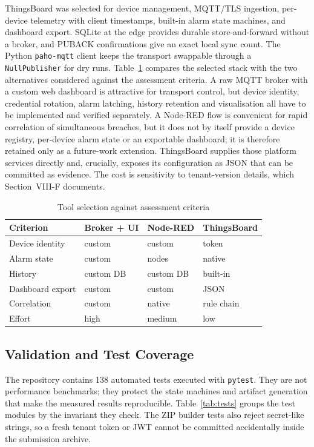 \documentclass[conference]{IEEEtran}
\begin{document}
ThingsBoard was selected for device management, MQTT/TLS ingestion, per-device telemetry
with client timestamps, built-in alarm state machines, and dashboard export. SQLite at
the edge provides durable store-and-forward without a broker, and PUBACK confirmations
give an exact local sync count. The Python \texttt{paho-mqtt} client keeps the transport
swappable through a \texttt{NullPublisher} for dry runs.
Table~\ref{tab:tools} compares the selected stack with the two alternatives
considered against the assessment criteria. A raw MQTT broker with a custom web
dashboard is attractive for transport control, but device identity, credential
rotation, alarm latching, history retention and visualisation all have to be
implemented and verified separately. A Node-RED flow is convenient for rapid
correlation of simultaneous breaches, but it does not by itself provide a
device registry, per-device alarm state or an exportable dashboard; it is
therefore retained only as a future-work extension. ThingsBoard supplies those
platform services directly and, crucially, exposes its configuration as JSON
that can be committed as evidence. The cost is sensitivity to tenant-version
details, which Section~VIII-F documents.

\begin{table}[t]
\caption{Tool selection against assessment criteria}
\label{tab:tools}
\centering
\scriptsize
\begin{tabular}{@{}llll@{}}
\toprule
Criterion & Broker + UI & Node-RED & ThingsBoard \\
\midrule
Device identity & custom & custom & token \\
Alarm state & custom & nodes & native \\
History & custom DB & custom DB & built-in \\
Dashboard export & custom & custom & JSON \\
Correlation & custom & native & rule chain \\
Effort & high & medium & low \\
\bottomrule
\end{tabular}
\end{table}

\subsection{Validation and Test Coverage}

The repository contains 138 automated tests executed with \texttt{pytest}. They
are not performance benchmarks; they protect the state machines and artifact
generation that make the measured results reproducible. Table~\ref{tab:tests}
groups the test modules by the invariant they check. The ZIP builder tests also
reject secret-like strings, so a fresh tenant token or JWT cannot be committed
accidentally inside the submission archive.
\end{document}
